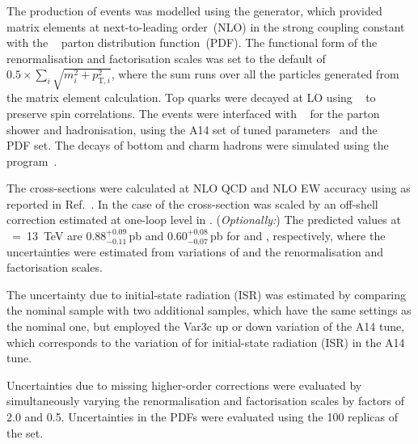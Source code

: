 The production of \ttV events was modelled using the \MGNLO[2.3.3]
\cite{Alwall:2014hca} generator, which provided matrix elements at
next-to-leading order~(NLO) in the strong coupling constant \alphas
with the \NNPDF[3.0nlo]~\cite{Ball:2014uwa} parton distribution
function~(PDF). The functional form of the renormalisation and
factorisation scales was set to the default of $0.5 \times \sum_i
\sqrt{m^2_i+p^2_{\text{T},i}}$, where the sum runs over all the particles
generated from the matrix element calculation. Top quarks were decayed
at LO using \MADSPIN~\cite{Frixione:2007zp,Artoisenet:2012st} to
preserve spin correlations. The events were interfaced with
\PYTHIA[8.210]~\cite{Sjostrand:2014zea} for the parton shower and
hadronisation, using the A14 set of tuned
parameters~\cite{ATL-PHYS-PUB-2014-021} and the
\NNPDF[2.3lo]~\cite{Ball:2014uwa} PDF set.  
The decays of bottom and charm hadrons were simulated using the \EVTGEN[1.2.0] program~\cite{Lange:2001uf}. 

The cross-sections were calculated at NLO QCD and NLO EW accuracy using
\MGNLO as reported in Ref.~\cite{deFlorian:2016spz}.
In the case of \ttll the cross-section was scaled by 
an off-shell correction estimated at one-loop level in \alphas.
(\emph{Optionally:})
The predicted values at \rts~=~\SI{13}{\TeV} are 0.88$^{+0.09}_{-0.11}$\,pb and
0.60$^{+0.08}_{-0.07}$\,pb for \ttZ and \ttW, respectively, where the
uncertainties were estimated from variations of \alphas and the renormalisation and
factorisation scales.

The uncertainty due to initial-state radiation (ISR) was estimated by
comparing the nominal \ttV sample with two additional samples, which
have the same settings as the nominal one, but employed the Var3c up or down
variation of the A14 tune, which corresponds
to the variation of \alphas for initial-state radiation
(ISR) in the A14 tune.

Uncertainties due to missing higher-order corrections were evaluated
by simultaneously varying the renormalisation and factorisation scales
by factors of 2.0 and 0.5. Uncertainties in the PDFs
were evaluated using the 100 replicas of the \NNPDF[3.0nlo] set.

\subsubsection[Sherpa]{\SHERPA}
\label{subsubsec:ttV_sherpa}


